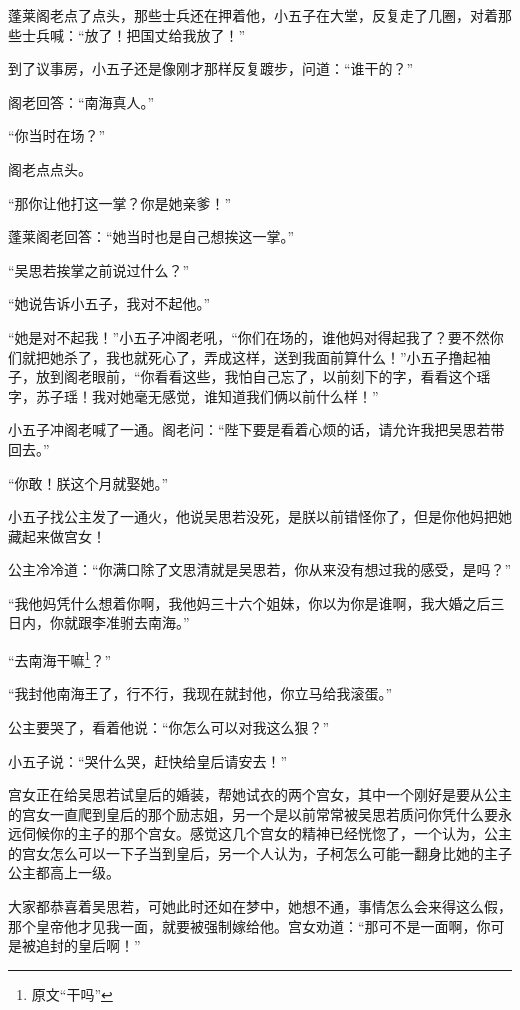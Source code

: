蓬莱阁老点了点头，那些士兵还在押着他，小五子在大堂，反复走了几圈，对着那些士兵喊：“放了！把国丈给我放了！”
\newline

到了议事房，小五子还是像刚才那样反复踱步，问道：“谁干的？”

阁老回答：“南海真人。”

“你当时在场？” 

阁老点点头。

“那你让他打这一掌？你是她亲爹！”

蓬莱阁老回答：“她当时也是自己想挨这一掌。”

“吴思若挨掌之前说过什么？”

“她说告诉小五子，我对不起他。”

“她是对不起我！”小五子冲阁老吼，“你们在场的，谁他妈对得起我了？要不然你们就把她杀了，我也就死心了，弄成这样，送到我面前算什么！”小五子撸起袖子，放到阁老眼前，“你看看这些，我怕自己忘了，以前刻下的字，看看这个瑶字，苏子瑶！我对她毫无感觉，谁知道我们俩以前什么样！”

小五子冲阁老喊了一通。阁老问：“陛下要是看着心烦的话，请允许我把吴思若带回去。”

“你敢！朕这个月就娶她。”
\newline

小五子找公主发了一通火，他说吴思若没死，是朕以前错怪你了，但是你他妈把她藏起来做宫女！

公主冷冷道：“你满口除了文思清就是吴思若，你从来没有想过我的感受，是吗？”

“我他妈凭什么想着你啊，我他妈三十六个姐妹，你以为你是谁啊，我大婚之后三日内，你就跟李准驸去南海。”

“去南海干嘛\footnote{原文“干吗”}？”

“我封他南海王了，行不行，我现在就封他，你立马给我滚蛋。”

公主要哭了，看着他说：“你怎么可以对我这么狠？”

小五子说：“哭什么哭，赶快给皇后请安去！”
\newline

宫女正在给吴思若试皇后的婚装，帮她试衣的两个宫女，其中一个刚好是要从公主的宫女一直爬到皇后的那个励志姐，另一个是以前常常被吴思若质问你凭什么要永远伺候你的主子的那个宫女。感觉这几个宫女的精神已经恍惚了，一个认为，公主的宫女怎么可以一下子当到皇后，另一个人认为，子柯怎么可能一翻身比她的主子公主都高上一级。

大家都恭喜着吴思若，可她此时还如在梦中，她想不通，事情怎么会来得这么假，那个皇帝他才见我一面，就要被强制嫁给他。宫女劝道：“那可不是一面啊，你可是被追封的皇后啊！”

